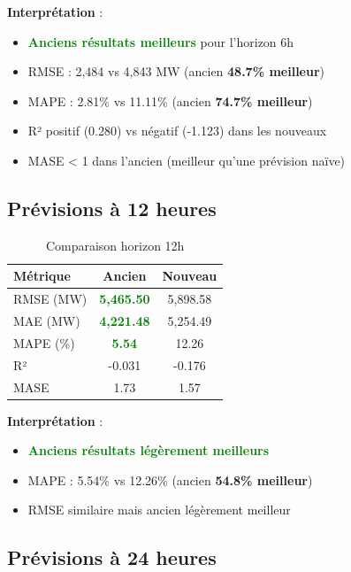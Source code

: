 \documentclass[12pt,a4paper]{article}
\begin{document}
\textbf{Interprétation} :
\begin{itemize}
    \item \textcolor{green}{\textbf{Anciens résultats meilleurs}} pour l'horizon 6h
    \item RMSE : 2,484 vs 4,843 MW (ancien \textbf{48.7\% meilleur})
    \item MAPE : 2.81\% vs 11.11\% (ancien \textbf{74.7\% meilleur})
    \item R² positif (0.280) vs négatif (-1.123) dans les nouveaux
    \item MASE < 1 dans l'ancien (meilleur qu'une prévision naïve)
\end{itemize}

\subsection{Prévisions à 12 heures}

\begin{table}[h]
\centering
\caption{Comparaison horizon 12h}
\label{tab:h12}
\begin{tabular}{lcc}
\toprule
\textbf{Métrique} & \textbf{Ancien} & \textbf{Nouveau} \\
\midrule
RMSE (MW) & \textcolor{green}{\textbf{5,465.50}} & 5,898.58 \\
MAE (MW) & \textcolor{green}{\textbf{4,221.48}} & 5,254.49 \\
MAPE (\%) & \textcolor{green}{\textbf{5.54}} & 12.26 \\
R² & -0.031 & -0.176 \\
MASE & 1.73 & 1.57 \\
\bottomrule
\end{tabular}
\end{table}

\textbf{Interprétation} :
\begin{itemize}
    \item \textcolor{green}{\textbf{Anciens résultats légèrement meilleurs}}
    \item MAPE : 5.54\% vs 12.26\% (ancien \textbf{54.8\% meilleur})
    \item RMSE similaire mais ancien légèrement meilleur
\end{itemize}

\subsection{Prévisions à 24 heures}
\end{document}
